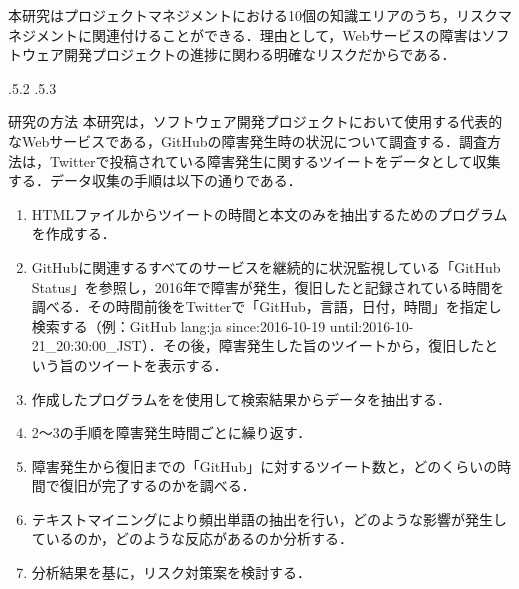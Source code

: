 \documentclass[uplatex]{jsarticle}
\makeatletter
\renewcommand{\section}{%
    \if@slide\clearpage\fi
    \@startsection{section}{1}{\z@}%
    {\Cvs \@plus.5\Cdp \@minus.2\Cdp}%
    {.5\Cvs \@plus.3\Cdp}%
    {\normalfont\raggedright}}
\makeatother
\begin{document}
本研究はプロジェクトマネジメントにおける10個の知識エリアのうち，リスクマネジメントに関連付けることができる．理由として，Webサービスの障害はソフトウェア開発プロジェクトの進捗に関わる明確なリスクだからである．

\section{研究の方法}
本研究は，ソフトウェア開発プロジェクトにおいて使用する代表的なWebサービスである，GitHubの障害発生時の状況について調査する．調査方法は，Twitterで投稿されている障害発生に関するツイートをデータとして収集する．データ収集の手順は以下の通りである\cite{03}．
\begin{enumerate}
 \item HTMLファイルからツイートの時間と本文のみを抽出するためのプログラムを作成する\cite{04}．
 \item GitHubに関連するすべてのサービスを継続的に状況監視している「GitHub Status」を参照し，2016年で障害が発生，復旧したと記録されている時間を調べる．その時間前後をTwitterで「GitHub，言語，日付，時間」を指定し検索する（例：GitHub lang:ja since:2016-10-19 until:2016-10-21\_20:30:00\_JST）．その後，障害発生した旨のツイートから，復旧したという旨のツイートを表示する．
 \item 作成したプログラムをを使用して検索結果からデータを抽出する．
 \item 2～3の手順を障害発生時間ごとに繰り返す．
 \item 障害発生から復旧までの「GitHub」に対するツイート数と，どのくらいの時間で復旧が完了するのかを調べる．
 \item テキストマイニングにより頻出単語の抽出を行い，どのような影響が発生しているのか，どのような反応があるのか分析する．
 \item 分析結果を基に，リスク対策案を検討する．
\end{enumerate}
\end{document}
